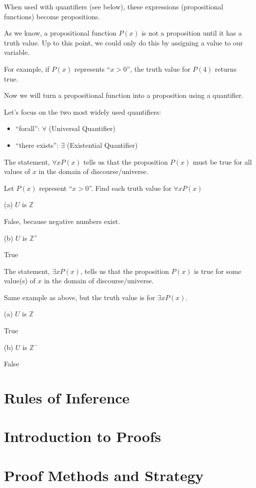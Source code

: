 \documentclass[../discrete.tex]{subfiles}
\begin{document}
When used with quantifiers (see below), these expressions (propositional functions) become propositions.

As we know, a propositional function $P(x)$ is not a proposition until it has a truth value. Up to this point, we could only do this by assigning a value to our variable.

For example, if $P(x)$ represents ``$x>0$'', the truth value for $P(4)$ returns true.

Now we will turn a propositional function into a proposition using a quantifier.

Let's focus on the two most widely used quantifiers:
\begin{itemize}
    \item ``forall'': $\forall$ (Universal Quantifier)
    \item ``there exists'': $\exists$ (Existential Quantifier)
\end{itemize}

The statement, $\forall xP(x)$ tells us that the proposition $P(x)$ must be true for all values of $x$ in the domain of discourse/universe.
\begin{example}
    Let $P(x)$ represent ``$x>0$''. Find each truth value for $\forall xP(x)$

    (a) $U$ is $\mathbb{Z}$

    False, because negative numbers exist.

    (b) $U$ is $\mathbb{Z}^+$

    True 
\end{example}

The statement, $\exists xP(x)$, tells us that the proposition $P(x)$ is true for some value(s) of $x$ in the domain of discourse/universe.

\begin{example}
    Same example as above, but the truth value is for $\exists xP(x)$.

    (a) $U$ is $\mathbb{Z}$

    True 

    (b) $U$ is $\mathbb{Z}^-$

    False 
\end{example}

\section{Rules of Inference}

\section{Introduction to Proofs}

\section{Proof Methods and Strategy}
\end{document}
